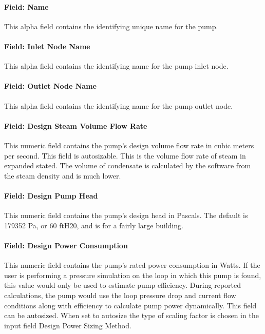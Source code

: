 \paragraph{Field: Name}

This alpha field contains the identifying unique name for the pump.

\paragraph{Field: Inlet Node Name}\label{field-inlet-node-name-2-001}

This alpha field contains the identifying name for the pump inlet node.

\paragraph{Field: Outlet Node Name}\label{field-outlet-node-name-2-001}

This alpha field contains the identifying name for the pump outlet node.

\paragraph{Field: Design Steam Volume Flow Rate}\label{field-design-steam-volume-flow-rate}

This numeric field contains the pump's design volume flow rate in cubic meters per second. This field is autosizable. This is the volume flow rate of steam in expanded stated. The volume of condensate is calculated by the software from the steam density and is much lower.

\paragraph{Field: Design Pump Head}\label{field-design-pump-head-2}

This numeric field contains the pump's design head in Pascals. The default is 179352 Pa, or 60 ftH20, and is for a fairly large building.

\paragraph{Field: Design Power Consumption}\label{field-design-power-consumption-2}

This numeric field contains the pump's rated power consumption in Watts. If the user is performing a pressure simulation on the loop in which this pump is found, this value would only be used to estimate pump efficiency. During reported calculations, the pump would use the loop pressure drop and current flow conditions along with efficiency to calculate pump power dynamically. This field can be autosized. When set to autosize the type of scaling factor is chosen in the input field Design Power Sizing Method.

